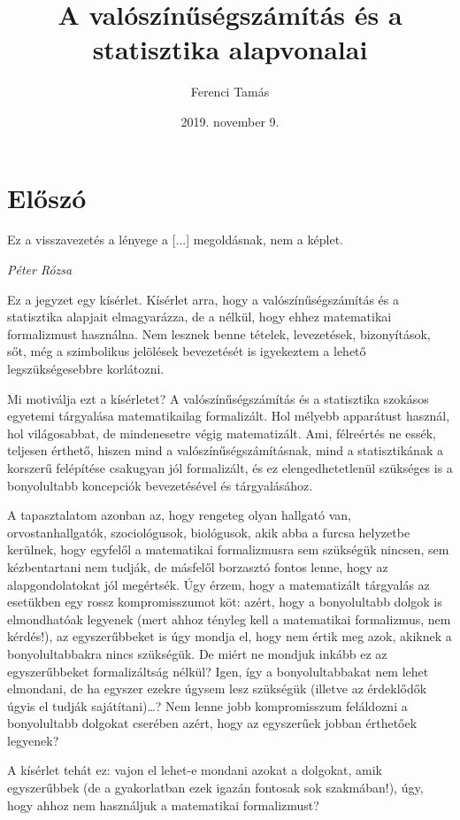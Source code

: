 \documentclass[magyar,]{book}
\title{A valószínűségszámítás és a statisztika alapvonalai}
\author{Ferenci Tamás}
\date{2019. november 9.}
\begin{document}
\maketitle

{
\setcounter{tocdepth}{1}
\tableofcontents
}
\hypertarget{elux151szuxf3}{%
\chapter*{Előszó}\label{elux151szuxf3}}

\epigraph{Ez a visszavezetés a lényege a [...] megoldásnak, nem a képlet.}{\textit{Péter Rózsa}}

Ez a jegyzet egy kísérlet. Kísérlet arra, hogy a valószínűségszámítás és a statisztika alapjait elmagyarázza, de a nélkül, hogy ehhez matematikai formalizmust használna. Nem lesznek benne tételek, levezetések, bizonyítások, sőt, még a szimbolikus jelölések bevezetését is igyekeztem a lehető legszükségesebbre korlátozni.

Mi motiválja ezt a kísérletet? A valószínűségszámítás és a statisztika szokásos egyetemi tárgyalása matematikailag formalizált. Hol mélyebb apparátust használ, hol világosabbat, de mindenesetre végig matematizált. Ami, félreértés ne essék, teljesen érthető, hiszen mind a valószínűségszámításnak, mind a statisztikának a korszerű felépítése csakugyan jól formalizált, és ez elengedhetetlenül szükséges is a bonyolultabb koncepciók bevezetésével és tárgyalásához.

A tapasztalatom azonban az, hogy rengeteg olyan hallgató van, orvostanhallgatók, szociológusok, biológusok, akik abba a furcsa helyzetbe kerülnek, hogy egyfelől a matematikai formalizmusra sem szükségük nincsen, sem kézbentartani nem tudják, de másfelől borzasztó fontos lenne, hogy az alapgondolatokat jól megértsék. Úgy érzem, hogy a matematizált tárgyalás az esetükben egy rossz kompromisszumot köt: azért, hogy a bonyolultabb dolgok is elmondhatóak legyenek (mert ahhoz tényleg kell a matematikai formalizmus, nem kérdés!), az egyszerűbbeket is úgy mondja el, hogy nem értik meg azok, akiknek a bonyolultabbakra nincs szükségük. De miért ne mondjuk inkább ez az egyszerűbbeket formalizáltság nélkül? Igen, így a bonyolultabbakat nem lehet elmondani, de ha egyszer ezekre úgysem lesz szükségük (illetve az érdeklődők úgyis el tudják sajátítani)\ldots? Nem lenne jobb kompromisszum feláldozni a bonyolultabb dolgokat cserében azért, hogy az egyszerűek jobban érthetőek legyenek?

A kísérlet tehát ez: vajon el lehet-e mondani azokat a dolgokat, amik egyszerűbbek (de a gyakorlatban ezek igazán fontosak sok szakmában!), úgy, hogy ahhoz nem használjuk a matematikai formalizmust?
\end{document}
